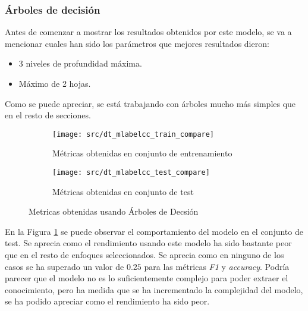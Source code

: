 \subsubsection*{Árboles de decisión}
Antes de comenzar a mostrar los resultados obtenidos por este modelo, se va a mencionar cuales han sido los parámetros que mejores resultados dieron:
\begin{itemize}
	\item 3 niveles de profundidad máxima.
	\item Máximo de 2 hojas.
\end{itemize}
Como se puede apreciar, se está trabajando con árboles mucho más simples que en el resto de secciones.
\begin{figure}[H]
	\centering
	\begin{subfigure}[b]{0.5\textwidth}
		\centering
		\texttt{[image: src/dt\_mlabelcc\_train\_compare]}
		\caption{Métricas obtenidas en conjunto de entrenamiento}
	\end{subfigure}
	\vfill
	\begin{subfigure}[b]{0.5\textwidth}
		\centering
		\texttt{[image: src/dt\_mlabelcc\_test\_compare]}
		\caption{Métricas obtenidas en conjunto de test}
	\end{subfigure}
	\vfill
	\caption{Metricas obtenidas usando Árboles de Decsión}
	\label{fig:dtml_cmp}
\end{figure} 
En la Figura  \ref{fig:dtml_cmp} se puede observar el comportamiento del modelo en el conjunto de test. Se aprecia como el rendimiento usando este modelo ha sido bastante peor que en el resto de enfoques seleccionados. Se aprecia como en ninguno de los casos se ha superado un valor de $0.25$ para las métricas \textit{F1} y \textit{accuracy}. Podría parecer que el modelo no es lo suficientemente complejo para poder extraer el conocimiento, pero ha medida que se ha incrementado la complejidad del modelo, se ha podido apreciar como el rendimiento ha sido peor.
\clearpage
